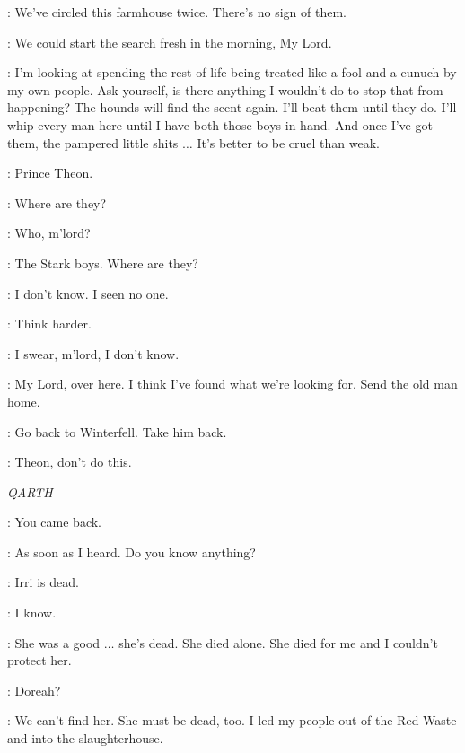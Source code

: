 \DAGMER: We've circled this farmhouse twice. There's no sign of them.


\LUWIN: We could start the search fresh in the morning, My Lord.

\THEON: I'm looking at spending the rest of life being treated like a fool and a eunuch by my own people. Ask yourself, is there anything I wouldn't do to stop that from happening? The hounds will find the scent again. I'll beat them until they do. I'll whip every man here until I have both those boys in hand. And once I've got them, the pampered little shits $\ldots$ It's better to be cruel than weak.


\DAGMER: Prince Theon.

\THEON: Where are they?

\FARMER: Who, m'lord?

\THEON: The Stark boys. Where are they?

\FARMER: I don't know. I seen no one.


\THEON: Think harder.

\FARMER: I swear, m'lord, I don't know.

\DAGMER: My Lord, over here. I think I've found what we're looking for. Send the old man home.


\THEON:  Go back to Winterfell.  Take him back.

\LUWIN: Theon, don't do this.


\scene

\textit{QARTH}


\DAENERYS: You came back.

\JORAH: As soon as I heard. Do you know anything?


\DAENERYS: Irri is dead.

\JORAH: I know.

\DAENERYS: She was a good $\ldots$ she's dead. She died alone. She died for me and I couldn't protect her.

\JORAH: Doreah?

\DAENERYS: We can't find her. She must be dead, too. I led my people out of the Red Waste and into the slaughterhouse.

